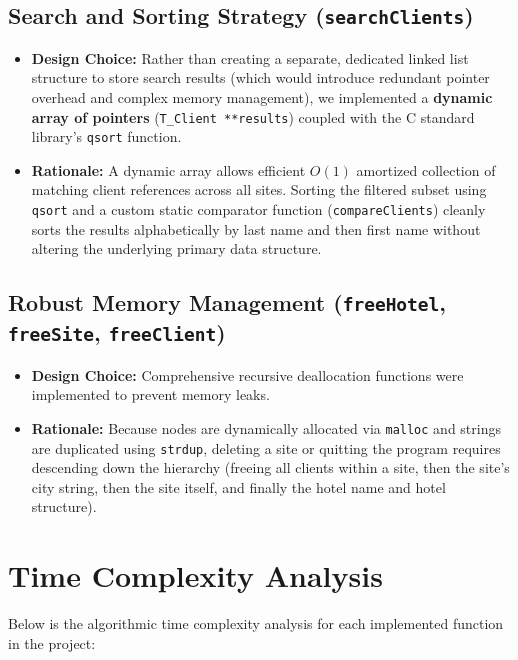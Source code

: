 \documentclass[11pt, a4paper]{article}
\begin{document}
\subsection{Search and Sorting Strategy (\texttt{searchClients})}
\begin{itemize}
    \item \textbf{Design Choice:} Rather than creating a separate, dedicated linked list structure to store search results (which would introduce redundant pointer overhead and complex memory management), we implemented a \textbf{dynamic array of pointers} (\texttt{T\_Client **results}) coupled with the C standard library's \texttt{qsort} function.
    \item \textbf{Rationale:} A dynamic array allows efficient $O(1)$ amortized collection of matching client references across all sites. Sorting the filtered subset using \texttt{qsort} and a custom static comparator function (\texttt{compareClients}) cleanly sorts the results alphabetically by last name and then first name without altering the underlying primary data structure.
\end{itemize}

\subsection{Robust Memory Management (\texttt{freeHotel}, \texttt{freeSite}, \texttt{freeClient})}
\begin{itemize}
    \item \textbf{Design Choice:} Comprehensive recursive deallocation functions were implemented to prevent memory leaks.
    \item \textbf{Rationale:} Because nodes are dynamically allocated via \texttt{malloc} and strings are duplicated using \texttt{strdup}, deleting a site or quitting the program requires descending down the hierarchy (freeing all clients within a site, then the site's city string, then the site itself, and finally the hotel name and hotel structure).
\end{itemize}

\section{Time Complexity Analysis}

Below is the algorithmic time complexity analysis for each implemented function in the project:
\end{document}
